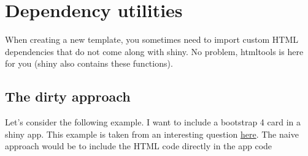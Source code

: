 \documentclass[]{book}
\newenvironment{Shaded}{\begin{snugshade}}{\end{snugshade}}
\newcommand{\CommentTok}[1]{\textcolor[rgb]{0.56,0.35,0.01}{\textit{#1}}}
\newcommand{\ControlFlowTok}[1]{\textcolor[rgb]{0.13,0.29,0.53}{\textbf{#1}}}
\newcommand{\DecValTok}[1]{\textcolor[rgb]{0.00,0.00,0.81}{#1}}
\newcommand{\KeywordTok}[1]{\textcolor[rgb]{0.13,0.29,0.53}{\textbf{#1}}}
\newcommand{\NormalTok}[1]{#1}
\newcommand{\OperatorTok}[1]{\textcolor[rgb]{0.81,0.36,0.00}{\textbf{#1}}}
\newcommand{\StringTok}[1]{\textcolor[rgb]{0.31,0.60,0.02}{#1}}
\begin{document}
\begin{Shaded}
\end{Shaded}

\hypertarget{htmltools-dependencies}{%
\chapter{Dependency utilities}\label{htmltools-dependencies}}

When creating a new template, you sometimes need to import custom HTML dependencies
that do not come along with shiny. No problem, htmltools is here for you (shiny also
contains these functions).

\hypertarget{the-dirty-approach}{%
\section{The dirty approach}\label{the-dirty-approach}}

Let's consider the following example. I want to include a bootstrap 4 card in a shiny app.
This example is taken from an interesting question \href{https://community.rstudio.com/t/create-a-div-using-htmltools-withtags/22439/2}{here}.
The naive approach would be to include the HTML code directly in the app code
\end{document}
